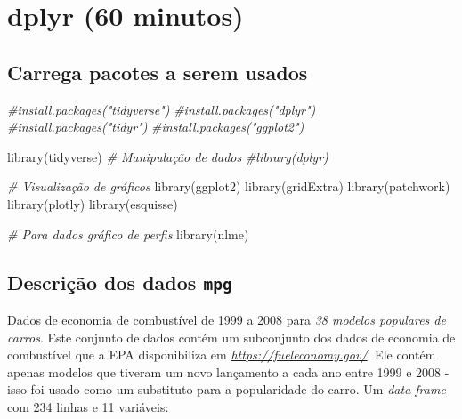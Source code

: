 \documentclass[
]{book}
\newenvironment{Shaded}{\begin{snugshade}}{\end{snugshade}}
\newcommand{\CommentTok}[1]{\textcolor[rgb]{0.56,0.35,0.01}{\textit{#1}}}
\newcommand{\FunctionTok}[1]{\textcolor[rgb]{0.00,0.00,0.00}{#1}}
\newcommand{\NormalTok}[1]{#1}
\begin{document}
\hypertarget{dplyr-60-minutos}{%
\chapter{dplyr (60 minutos)}\label{dplyr-60-minutos}}

\hypertarget{carrega-pacotes-a-serem-usados-1}{%
\section{Carrega pacotes a serem usados}\label{carrega-pacotes-a-serem-usados-1}}

\begin{Shaded}
\begin{Highlighting}[]
\CommentTok{\#install.packages("tidyverse") }
\CommentTok{\#install.packages("dplyr")     }
\CommentTok{\#install.packages("tidyr")     }
\CommentTok{\#install.packages("ggplot2")   }

\FunctionTok{library}\NormalTok{(tidyverse)}
\CommentTok{\# Manipulação de dados}
\CommentTok{\#library(dplyr)}

\CommentTok{\# Visualização de gráficos}
\FunctionTok{library}\NormalTok{(ggplot2)}
\FunctionTok{library}\NormalTok{(gridExtra)}
\FunctionTok{library}\NormalTok{(patchwork)}
\FunctionTok{library}\NormalTok{(plotly)}
\FunctionTok{library}\NormalTok{(esquisse)}

\CommentTok{\# Para dados gráfico de perfis}
\FunctionTok{library}\NormalTok{(nlme)}
\end{Highlighting}
\end{Shaded}

\hypertarget{descriuxe7uxe3o-dos-dados-mpg}{%
\section{\texorpdfstring{Descrição dos dados \texttt{mpg}}{Descrição dos dados mpg}}\label{descriuxe7uxe3o-dos-dados-mpg}}

Dados de economia de combustível de 1999 a 2008 para \emph{38 modelos populares de carros}. Este conjunto de dados contém um subconjunto dos dados de economia de combustível que a EPA disponibiliza em \emph{\url{https://fueleconomy.gov/}}. Ele contém apenas modelos que tiveram um novo lançamento a cada ano entre 1999 e 2008 - isso foi usado como um substituto para a popularidade do carro. Um \emph{data frame} com 234 linhas e 11 variáveis:
\end{document}
